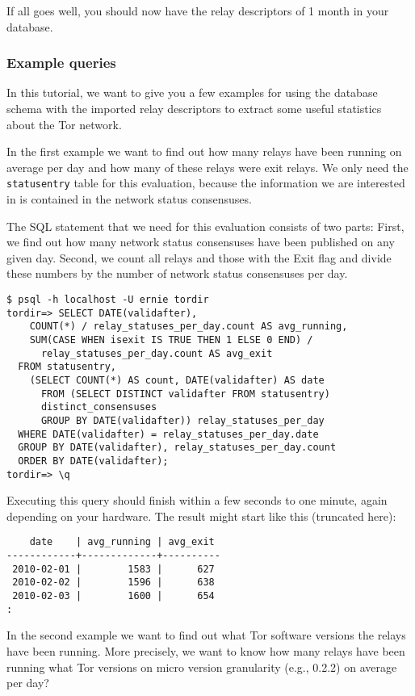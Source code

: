 \documentclass{article}
\begin{document}
If all goes well, you should now have the relay descriptors of 1 month in
your database.

\subsubsection{Example queries}

In this tutorial, we want to give you a few examples for using the
database schema with the imported relay descriptors to extract some useful
statistics about the Tor network.

In the first example we want to find out how many relays have been running
on average per day and how many of these relays were exit relays.
We only need the \verb+statusentry+ table for this evaluation, because
the information we are interested in is contained in the network status
consensuses.

The SQL statement that we need for this evaluation consists of two parts:
First, we find out how many network status consensuses have been published
on any given day.
Second, we count all relays and those with the Exit flag and divide these
numbers by the number of network status consensuses per day.

\begin{verbatim}
$ psql -h localhost -U ernie tordir
tordir=> SELECT DATE(validafter),
    COUNT(*) / relay_statuses_per_day.count AS avg_running,
    SUM(CASE WHEN isexit IS TRUE THEN 1 ELSE 0 END) /
      relay_statuses_per_day.count AS avg_exit
  FROM statusentry,
    (SELECT COUNT(*) AS count, DATE(validafter) AS date
      FROM (SELECT DISTINCT validafter FROM statusentry)
      distinct_consensuses
      GROUP BY DATE(validafter)) relay_statuses_per_day
  WHERE DATE(validafter) = relay_statuses_per_day.date
  GROUP BY DATE(validafter), relay_statuses_per_day.count
  ORDER BY DATE(validafter);
tordir=> \q
\end{verbatim}

Executing this query should finish within a few seconds to one minute,
again depending on your hardware.
The result might start like this (truncated here):

\begin{verbatim}
    date    | avg_running | avg_exit
------------+-------------+----------
 2010-02-01 |        1583 |      627
 2010-02-02 |        1596 |      638
 2010-02-03 |        1600 |      654
:
\end{verbatim}

In the second example we want to find out what Tor software versions the
relays have been running.
More precisely, we want to know how many relays have been running what Tor
versions on micro version granularity (e.g., 0.2.2) on average per day?
\end{document}
